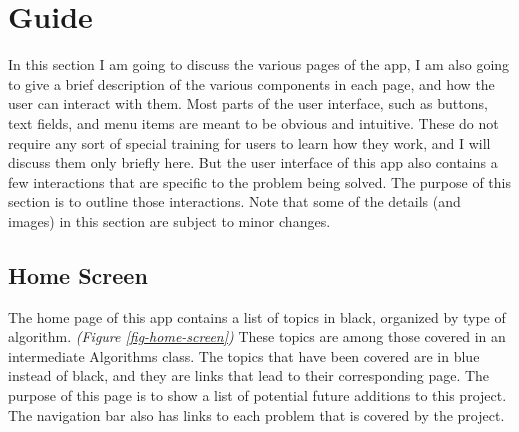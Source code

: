 \chapter{Guide}
In this section I am going to discuss the various pages of the app, 
I am also going to give a brief description of the various components in each page,
and how the user can interact with them.
Most parts of the user interface, such as buttons, text fields, and menu items are meant 
to be obvious and intuitive. 
These do not require any sort of special training for users to learn how they work,
and I will discuss them only briefly here. 
But the user interface of this app also contains a few interactions that are specific
to the problem being solved. The purpose of this section is to outline those interactions.
Note that some of the details (and images) in this section are subject to minor changes.
\section{Home Screen}
The home page of this app contains a list of topics in black, 
organized by type of algorithm. 
\textit{(Figure \ref{fig-home-screen})} 
These topics are among those covered in an intermediate Algorithms class. 
The topics that have been covered are in blue instead of black,
and they are links that lead to their corresponding page. 
The purpose of this page is to show a list of potential future additions 
to this project. 
The navigation bar also has links to each problem that is covered by the project. 
